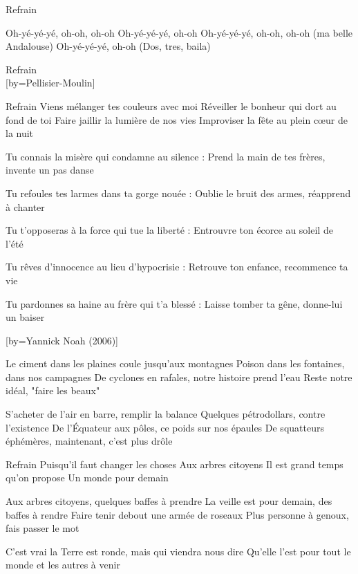 	Refrain

\beginverse
Oh-yé-yé-yé, oh-oh, oh-oh
Oh-yé-yé-yé, oh-oh
Oh-yé-yé-yé, oh-oh, oh-oh (ma belle Andalouse)
Oh-yé-yé-yé, oh-oh
(Dos, tres, baila)
\endverse

	Refrain\\[bis]

[by={Pellisier-Moulin}]

	Refrain
Viens mélanger tes couleurs avec moi
Réveiller le bonheur qui dort au fond de toi
Faire jaillir la lumière de nos vies
Improviser la fête au plein cœur de la nuit

\beginverse
Tu connais la misère qui condamne au silence :
Prend la main de tes frères, invente un pas danse \!
\endverse

\beginverse
Tu refoules tes larmes dans ta gorge nouée :
Oublie le bruit des armes, réapprend à chanter \!
\endverse

\beginverse
Tu t'opposeras à la force qui tue la liberté :
Entrouvre ton écorce au soleil de l'été \!
\endverse

\beginverse
Tu rêves d'innocence au lieu d'hypocrisie :
Retrouve ton enfance, recommence ta vie \!
\endverse

\beginverse
Tu pardonnes sa haine au frère qui t'a blessé :
Laisse tomber ta gêne, donne-lui un baiser \!
\endverse

[by={Yannick Noah (2006)}]

\beginverse
Le ciment dans les plaines coule jusqu'aux montagnes
Poison dans les fontaines, dans nos campagnes
De cyclones en rafales, notre histoire prend l'eau
Reste notre idéal, "faire les beaux"
\endverse

\beginverse
S'acheter de l'air en barre, remplir la balance
Quelques pétrodollars, contre l'existence
De l'Équateur aux pôles, ce poids sur nos épaules
De squatteurs éphémères, maintenant, c'est plus drôle
\endverse

	Refrain
Puisqu'il faut changer les choses
Aux arbres citoyens
Il est grand temps qu'on propose
Un monde pour demain

\beginverse
Aux arbres citoyens, quelques baffes à prendre
La veille est pour demain, des baffes à rendre
Faire tenir debout une armée de roseaux
Plus personne à genoux, fais passer le mot
\endverse

\beginverse
C'est vrai la Terre est ronde, mais qui viendra nous dire
Qu'elle l'est pour tout le monde et les autres à venir
\endverse

